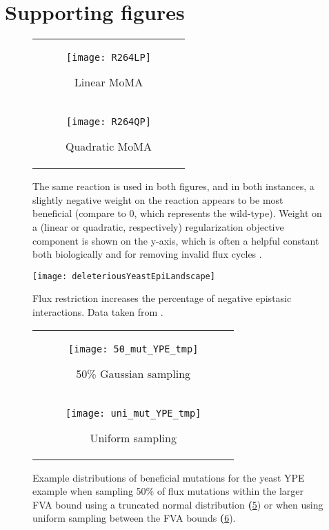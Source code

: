 \section{Supporting figures}

\begin{figure}[H]
\centering
\begin{tabular}{c}
\begin{subfigure}[b]{\textwidth}
  \texttt{[image: R264LP]}
  \caption{Linear MoMA} 
  \label{fig:R264LP}
\end{subfigure}
\\
\begin{subfigure}[b]{\textwidth}
  \texttt{[image: R264QP]}
  \caption{Quadratic MoMA} 
  \label{fig:R264QP}
\end{subfigure}
\\
\end{tabular}
\caption{The same reaction is used in both figures, and in both
instances, a slightly negative weight on the reaction appears to be
most beneficial (compare to 0, which represents the wild-type).
Weight on a (linear or quadratic, respectively) 
regularization objective component is shown on the y-axis, which is often a helpful
constant both biologically and for removing invalid flux cycles 
\citep{Schuetz2012, Smallbone2009a}.}
\label{fig:wMoMA_smoothness}
\end{figure}

\begin{figure}[H]
\centering
  \texttt{[image: deleteriousYeastEpiLandscape]}
  \caption{Flux restriction increases the percentage of negative
  epistasic interactions. Data taken from \citet{Xu2012}.}
  \label{fig:delYeastEpiLandscape}
\end{figure}

\begin{figure}[H]
\centering
\begin{tabular}{c}
\begin{subfigure}[b]{\textwidth}
  \texttt{[image: 50\_mut\_YPE\_tmp]}
  \caption{50\% Gaussian sampling} 
  \label{fig:beneEpiPairwise:50}
\end{subfigure}
\\
\begin{subfigure}[b]{\textwidth}
  \texttt{[image: uni\_mut\_YPE\_tmp]}
  \caption{Uniform sampling}
  \label{fig:beneEpiPairwise:uni}
\end{subfigure}
\\
\end{tabular}
\caption{Example distributions of beneficial mutations for the yeast
YPE example when sampling 50\% of flux mutations within the larger FVA
bound using a truncated normal distribution
\textbf(\ref{fig:beneEpiPairwise:50}) or when using uniform sampling
between the FVA bounds \textbf(\ref{fig:beneEpiPairwise:uni}).}
\label{fig:50andUniSampling}
\end{figure}


